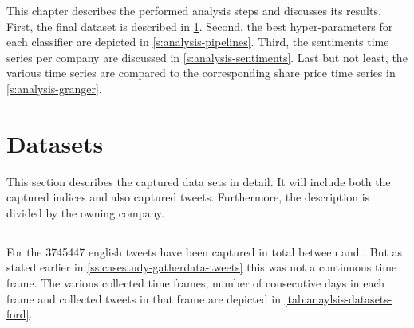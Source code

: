 


\newcommand{\significantMarks}{(* marks significant value)}
\newcommand{\indicesCaption}[1]{Indices of #1 within the evaluation time frame}
\newcommand{\resultsCaption}[1]{Normalized sentiment and share values of #1 within the evaluation time frame}
\newcommand{\sentimentsCaption}[1]{Summarized and normalized sentiment values of #1 within the evaluation time frame}
\newcommand{\tweetsCaption}[1]{Collection time frames of tweets for #1}
\newcommand{\confusionCaption}[1]{Confusion matrix of classifier #1}
\newcommand{\hyperCaption}[1]{Determined hyper-parameters for pipeline of classifier #1}
\newcommand{\oppositeCaption}[1]{Days with opposite sentiment values for the company #1}

This chapter describes the performed analysis steps and discusses its results.
First, the final dataset is described in \cref{s:analysis-datasets}.
Second, the best hyper-parameters for each classifier are depicted in \cref{s:analysis-pipelines}.
Third, the sentiments time series per company are discussed in \cref{s:analysis-sentiments}.
Last but not least, the various time series are compared to the corresponding share price time series in \cref{s:analysis-granger}.

\section{Datasets}
\label{s:analysis-datasets}

This section describes the captured data sets in detail.
It will include both the captured indices and also captured tweets.
Furthermore, the description is divided by the owning company.

\subsection{\ford}
\label{ss:analysis-datasets-ford}


For the \ford{} \num{3745447} english tweets have been captured in total between  and .
But as stated earlier in \cref{ss:casestudy-gatherdata-tweets} this was not a continuous time frame.
The various collected time frames, number of consecutive days in each frame and collected tweets in that frame are depicted in \cref{tab:anaylsis-datasets-ford}.

